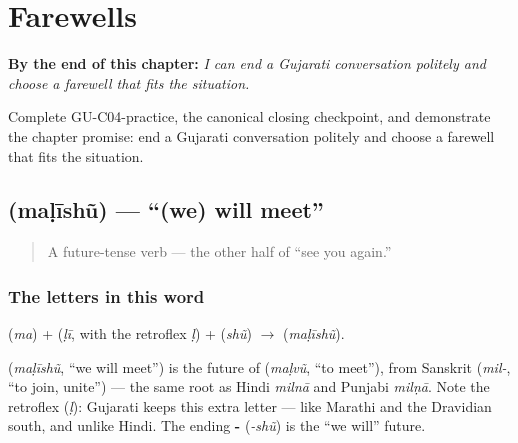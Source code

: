 
\chapter{Farewells}
\label{ch:farewells}

\begin{chapteropening}
\textbf{By the end of this chapter:} \emph{I can end a Gujarati conversation politely and choose a farewell that fits the situation.}

Complete GU-C04-practice, the canonical closing checkpoint, and demonstrate the chapter promise: end a Gujarati conversation politely and choose a farewell that fits the situation.
\end{chapteropening}

\section[\gu{મળીશું}]{ (maḷīshũ) — \textquotedblleft{}(we) will meet\textquotedblright{}}

\label{lesson:GU-C04-malishun}



\begin{quote}
A future-tense verb — the other half of \textquotedblleft{}see you again.\textquotedblright{}
\end{quote}

\subsection*{The letters in this word}
\textbf{} (\emph{ma}) + \textbf{} (\emph{ḷī}, with the retroflex \textbf{} \emph{ḷ}) + \textbf{} (\emph{shũ}) $\to$ \textbf{} (\emph{maḷīshũ}).

\begin{cousinweb}
\textbf{} (\emph{maḷīshũ}, \textquotedblleft{}we will meet\textquotedblright{}) is the future of \textbf{} (\emph{maḷvũ}, \textquotedblleft{}to meet\textquotedblright{}), from Sanskrit \textbf{} (\emph{mil-}, \textquotedblleft{}to join, unite\textquotedblright{}) — the same root as Hindi \emph{milnā} and Punjabi \emph{milṇā}. Note the retroflex \textbf{} (\emph{ḷ}): Gujarati keeps this extra letter — like Marathi and the Dravidian south, and unlike Hindi. The ending \textbf{-} (\emph{-shũ}) is the \textquotedblleft{}we will\textquotedblright{} future.
\end{cousinweb}

